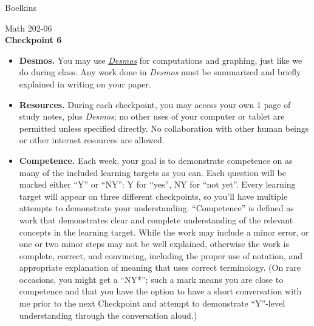 \documentclass[11 pt]{article}
\begin{document}
 \hfill Boelkins \\
 
\begin{center}
Math 202-06 \\
{\bf Checkpoint 6}
\end{center}



\begin{itemize}
	
	\item {\bf Desmos.} You may use \href{https://www.desmos.com/calculator}{\emph{Desmos}} for computations and graphing, just like we do during class.  Any work done in \emph{Desmos} must be summarized and briefly explained in writing on your paper.  
	
	\item {\bf Resources.} During each checkpoint, you may access your own 1 page of study notes, plus \emph{Desmos}; no other uses of your computer or tablet are permitted unless specified directly.  No collaboration with other human beings or other internet resources are allowed.
	
	
	\item {\bf Competence.} Each week, your goal is to demonstrate competence on as many of the included learning targets as you can.  Each question will be marked either ``Y'' or ``NY'': Y for ``yes'', NY for ``not yet''.  Every learning target will appear on three different checkpoints, so you'll have multiple attempts to demonstrate your understanding.  ``Competence'' is defined as work that demonstrates clear and complete understanding of the relevant concepts in the learning target. While the work may include a minor error, or one or two minor steps may not be well explained, otherwise the work is complete, correct, and convincing, including the proper use of notation, and appropriate explanation of meaning that uses correct terminology.  (On rare occasions, you might get a ``NY*''; such a mark means you are close to competence and that you have the option to have a short conversation with me prior to the next Checkpoint and attempt to demonstrate ``Y''-level understanding through the conversation aloud.)	
\end{itemize}

\noindent \hrulefill \\
\end{document}
